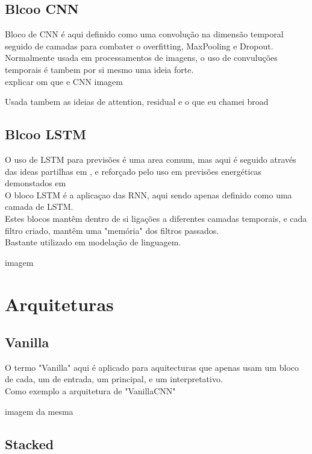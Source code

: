 \subsection{Blcoo CNN\label{se:cnn}}

Bloco de CNN é aqui definido como uma convolução na dimensão temporal seguido de camadas para combater o overfitting, MaxPooling e Dropout. \\
Normalmente usada em processamentos de imagens, o uso de convuluções temporais é tambem por si mesmo uma ideia forte. \\

explicar om que e CNN
imagem

Usada tambem as ideias de attention, residual e o que eu chamei broad


\subsection{Blcoo LSTM\label{se:lstm}}

O uso de LSTM para previsões é uma area comum, mas aqui é seguido através das ideas partilhas em \cite{Hewamalage2021}, e reforçado pelo uso em previsões energéticas demonstados em \cite{Costa2022} \\
O bloco LSTM é a aplicaçao das RNN, aqui sendo apenas definido como uma camada de LSTM. \\
Estes blocos mantêm dentro de si ligações a diferentes camadas temporais, e cada filtro criado, mantêm uma "memória" dos filtros passados. \\
Bastante utilizado em modelação de linguagem.

imagem


\section{Arquiteturas \label{se:arquitecturas}}

\subsection{Vanilla \label{se:vannila}}

O termo "Vanilla" aqui é aplicado para aquitecturas que apenas usam um bloco de cada, um de entrada, um principal, e um interpretativo. \\
Como exemplo a arquitetura de "VanillaCNN"

imagem da mesma

\subsection{Stacked\label{se:stacked}}

